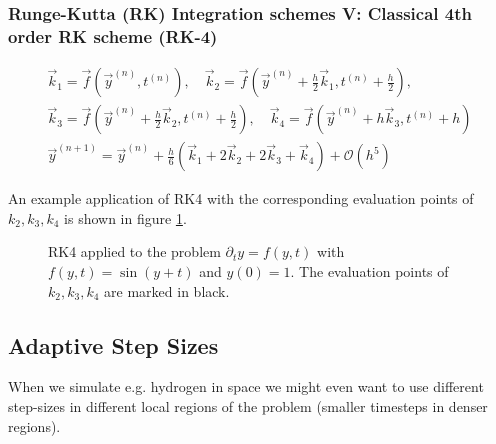 \subsubsection{Runge-Kutta (RK) Integration schemes V: Classical 4th order RK scheme (RK-4)}
\begin{equation}
  \begin{gathered}
    \vec{k}_1 = \vec{f}(\vec{y}^{(n)}, t^{(n)}), \quad \vec{k}_2 = \vec{f}(\vec{y}^{(n)} + \frac{h}{2} \vec{k}_1, t^{(n)} + \frac{h}{2}), \\
    \vec{k}_3 = \vec{f}(\vec{y}^{(n)} + \frac{h}{2} \vec{k}_2, t^{(n)} + \frac{h}{2}), \quad \vec{k}_4 = \vec{f}(\vec{y}^{(n)} + h \vec{k}_3, t^{(n)} + h) \\
    \vec{y}^{(n+1)} = \vec{y}^{(n)} + \frac{h}{6} \left( \vec{k}_1 + 2 \vec{k}_2 + 2 \vec{k}_3 + \vec{k}_4 \right) + \mathcal{O}(h^5)
  \end{gathered}
\end{equation}

An example application of RK4 with the corresponding evaluation points of $k_2, k_3, k_4$ is shown in figure \ref{fig:rk4_heat}.

\begin{figure}[!htb]
  \centering
  \hfill
  \caption{RK4 applied to the problem $\partial_t y = f(y,t)$ with $f(y,t) = \sin(y+t)$ and $y(0) = 1$. The evaluation points of $k_2, k_3, k_4$ are marked in black.}
  \label{fig:rk4_heat}
\end{figure}

\subsection{Adaptive Step Sizes}
When we simulate e.g. hydrogen in space we might even want to use different step-sizes in different local regions
of the problem (smaller timesteps in denser regions).

